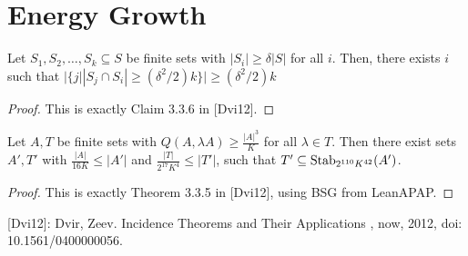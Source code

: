 \chapter{Energy Growth}
\label{chap:egrowth}

\begin{theorem}
    \label{claim336}
    \leanok

    Let $S_1, S_2, \dots, S_k \subseteq S$ be finite sets with $|S_i| \geq \delta |S|$ for all $i$.
    Then, there exists $i$ such that $|\{j | |S_j \cap S_i| \geq (\delta^2 / 2) k\}| \geq (\delta^2 / 2) k$
\end{theorem}

\begin{proof}
    \leanok
    This is exactly Claim 3.3.6 in [Dvi12].
\end{proof}

\begin{theorem}
    \label{Theorem335}
    \leanok

    Let $A, T$ be finite sets with $Q(A, \lambda A) \geq \frac{|A|^3}K$ for all $\lambda \in T$.
    Then there exist sets $A', T'$ with $\frac{|A|}{16 K} \leq |A'|$ and
        $\frac{|T|}{2^{17} K^4} \leq |T'|$, such that $T' \subseteq \operatorname{\operatorname{Stab}}_{2^{110} K^{42}}(A')$.
\end{theorem}

\begin{proof}
    \leanok
    This is exactly Theorem 3.3.5 in [Dvi12], using BSG from LeanAPAP.
\end{proof}

[Dvi12]: Dvir, Zeev. Incidence Theorems and Their Applications , now, 2012, doi: 10.1561/0400000056.